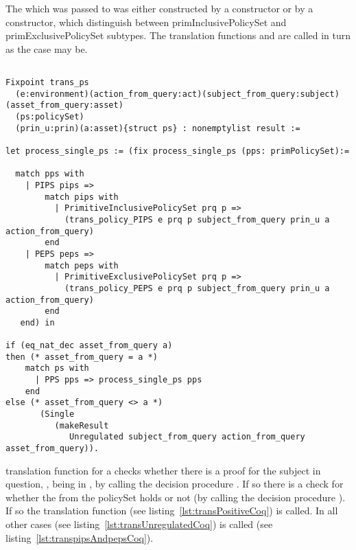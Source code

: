 The  which was passed to  was either constructed by a  constructor or by a  constructor, which distinguish between primInclusivePolicySet and primExclusivePolicySet subtypes. The translation functions  and  are called in turn as the case may be.


\begin{lstlisting}

Fixpoint trans_ps
  (e:environment)(action_from_query:act)(subject_from_query:subject)(asset_from_query:asset)
  (ps:policySet)
  (prin_u:prin)(a:asset){struct ps} : nonemptylist result :=

let process_single_ps := (fix process_single_ps (pps: primPolicySet):=
  
  match pps with 
    | PIPS pips => 
        match pips with 
          | PrimitiveInclusivePolicySet prq p => 
            (trans_policy_PIPS e prq p subject_from_query prin_u a action_from_query)                
        end
    | PEPS peps => 
        match peps with 
          | PrimitiveExclusivePolicySet prq p => 
            (trans_policy_PEPS e prq p subject_from_query prin_u a action_from_query)
        end  
   end) in

if (eq_nat_dec asset_from_query a)
then (* asset_from_query = a *)  
    match ps with
      | PPS pps => process_single_ps pps
    end
else (* asset_from_query <> a *)
       (Single 
          (makeResult 
             Unregulated subject_from_query action_from_query asset_from_query)).
\end{lstlisting}




 translation function for a  checks whether there is a proof for the subject in question, , being in , by calling the decision procedure . If so there is a check for whether the  from the policySet holds or not (by calling the decision procedure ). If so the translation function  (see listing~\ref{lst:transPositiveCoq}) is called. In all other cases  (see listing~\ref{lst:transUnregulatedCoq}) is called (see listing~\ref{lst:transpipsAndpepsCoq}).

